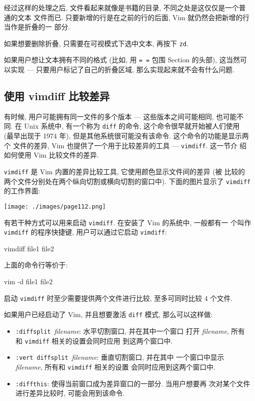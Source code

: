 经过这样的处理之后, 文件看起来就像是书籍的目录, 不同之处是这仅仅是一个普通的文本
文件而已. 只要新增的行是在之前的行的后面, Vim 就仍然会把新增的行当作是折叠的一
部分.

如果想要删除折叠, 只需要在可视模式下选中文本, 再按下 \texttt{zd}.

如果用户想让文本拥有不同的格式 (比如, 用 \texttt{= =} 包围 Section 的头部),
这当然可以实现 --- 只要用户标记了自己的折叠区域, 那么实现起来就不会有什么问题.

\subsection{使用 vimdiff 比较差异}
\label{subsec:using_vimdiff_to_track_the_changes}

有时候, 用户可能拥有同一文件的多个版本 --- 这些版本之间可能相同, 也可能不同.
在 Unix 系统中, 有一个称为 \texttt{diff} 的命令, 这个命令很早就开始被人们使用
(最早出现于 1974 年), 但是其他系统很可能没有该命令. 这个命令的功能是显示两个
文件的差异, Vim 也提供了一个用于比较差异的工具 --- \texttt{vimdiff}. 这一节介
绍如何使用 Vim 比较文件的差异.

\texttt{vimdiff} 是 Vim 内置的差异比较工具, 它使用颜色显示文件间的差异 (被
比较的两个文件分别处在两个纵向切割或横向切割的窗口中). 下面的图片显示了
\texttt{vimdiff} 的工作界面:
\begin{center}
    \texttt{[image: ./images/page112.png]}
\end{center}

有若干种方式可以用来启动 \texttt{vimdiff}. 在安装了 Vim 的系统中, 一般都有一
个叫作 \texttt{vimdiff} 的程序快捷键, 用户可以通过它启动 \texttt{vimdiff}:
\begin{vimcode}
vimdiff file1 file2
\end{vimcode}
上面的命令行等价于:
\begin{vimcode}
vim -d file1 file2
\end{vimcode}

启动 \texttt{vimdiff} 时至少需要提供两个文件进行比较, 至多可同时比较 4 个文件.

如果用户已经启动了 Vim, 并且想要激活 \texttt{diff} 模式, 那么可以这样做:
\begin{itemize}
    \item \texttt{:diffsplit }\textit{filename}: 水平切割窗口, 并在其中一个窗口
        打开 \textit{filename}, 所有和 \texttt{vimdiff} 相关的设置会同时应用
        到这两个窗口中.
    \item \texttt{:vert diffsplit }\textit{filename}: 垂直切割窗口, 并在其中
        一个窗口中显示 \textit{filename}, 所有和 \texttt{vimdiff} 相关的设置
        会同时应用到这两个窗口中.
    \item \texttt{:diffthis}: 使得当前窗口成为差异窗口的一部分. 当用户想要再
        次对某个文件进行差异比较时, 可能会用到该命令.
\end{itemize}

